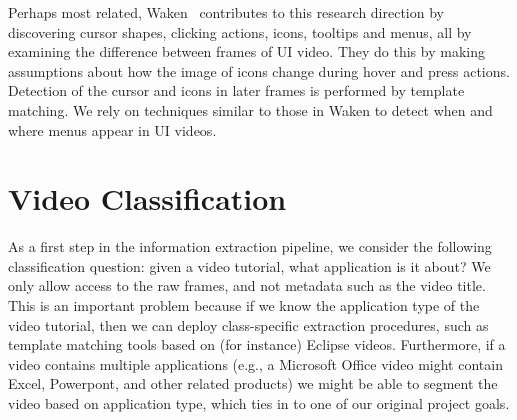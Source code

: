 \documentclass[10pt]{article}
\begin{document}
Perhaps most related, Waken~\cite{banovic_waken_2012}
contributes to this research direction by discovering cursor shapes, clicking actions, icons, tooltips and
menus, all by examining the difference between frames of UI video.  They do this by making
assumptions about how the image of icons change during hover and press actions.  Detection of the
cursor and icons in later frames is performed by template matching.  We rely on techniques similar
to those in Waken to detect when and where menus appear in UI videos.


\section{Video Classification}\label{sec:daniel}

As a first step in the information extraction pipeline, we consider the following classification
question: given a video tutorial, what application is it about? We only allow access to the raw
frames, and not metadata such as the video title.  This is an important problem because if we know
the application type of the video tutorial, then we can deploy class-specific extraction procedures,
such as template matching tools based on (for instance) Eclipse videos. Furthermore, if a video
contains multiple applications (e.g., a Microsoft Office video might contain Excel, Powerpont, and
other related products) we might be able to segment the video based on application type, which ties
in to one of our original project goals.
\end{document}
